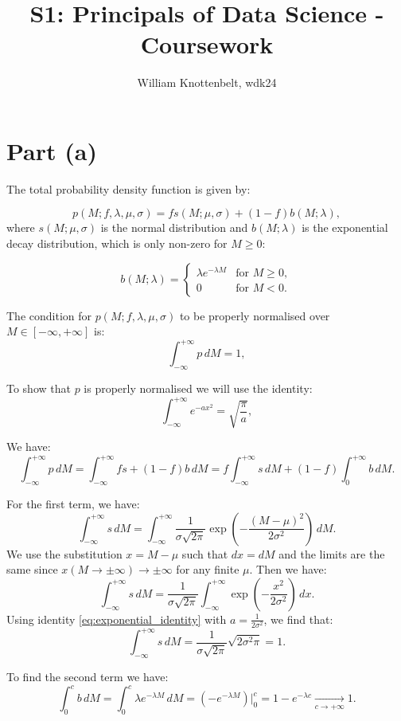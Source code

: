 \documentclass{article}
\title{S1: Principals of Data Science - Coursework}
\author{William Knottenbelt, wdk24}
\begin{document}
\maketitle

\section*{Part (a)}

The total probability density function is given by:

\[ p(M; f, \lambda, \mu, \sigma) = fs(M; \mu, \sigma) + (1-f)b(M; \lambda), \]
where $s(M; \mu, \sigma)$ is the normal distribution and $ b(M; \lambda)$ is the exponential decay distribution, which is only non-zero for $M \geq 0$:

\[ 
b(M; \lambda) = 
\begin{cases} 
\lambda e^{-\lambda M} & \text{for } M \geq 0, \\
0 & \text{for } M < 0.
\end{cases}
\]

The condition for $p(M; f, \lambda, \mu, \sigma)$ to be properly normalised over $M \in [-\infty, +\infty]$ is:
\[ \int_{-\infty}^{+\infty} p \, dM = 1, \]

To show that $p$ is properly normalised we will use the identity:
\begin{equation}
\int_{-\infty}^{+\infty} e^{-ax^2} = \sqrt{\frac{\pi}{a}},
\label{eq:exponential_identity}
\end{equation}

We have:
\[ 
\int_{-\infty}^{+\infty} p \, dM = 
\int_{-\infty}^{+\infty} fs + (1-f)b \, dM =
f\int_{-\infty}^{+\infty} s \, dM + 
(1-f)\int_{0}^{+\infty} b \, dM.
\]

For the first term, we have:
\[
\int_{-\infty}^{+\infty} s \, dM =
\int_{-\infty}^{+\infty} \frac{1}{\sigma\sqrt{2\pi}} \exp\left(-\frac{(M - \mu)^2}{2\sigma^2}\right) \, dM.
\]
We use the substitution $x = M - \mu$ such that $dx = dM$ and the limits are the same since $x(M \to \pm\infty) \to \pm\infty$ for any finite $\mu$. Then we have:
\[
\int_{-\infty}^{+\infty} s \, dM =
\frac{1}{\sigma\sqrt{2\pi}} \int_{-\infty}^{+\infty} \exp\left(-\frac{x^2}{2\sigma^2}\right) \, dx.
\]
Using identity \eqref{eq:exponential_identity} with $a = \frac{1}{2\sigma^2}$, we find that:
\[
\int_{-\infty}^{+\infty} s \, dM =
\frac{1}{\sigma\sqrt{2\pi}} \sqrt{2\sigma^2\pi} = 1.
\]

To find the second term we have:
\[
\int_{0}^{c} b \, dM =
\int_{0}^{c} \lambda e^{-\lambda M} \, dM =
(-e^{-\lambda M}) |_0^{c} =
1 - e^{-\lambda c}
\xrightarrow[c \to +\infty]{} 1.
\]
\end{document}
